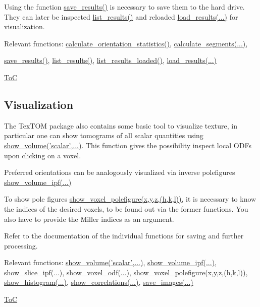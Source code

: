 Using the function \hyperref[fun:saveresults]{save\_results()} is necessary to save them to the hard drive.
They can later be inspected \hyperref[fun:listresults]{list\_results()} and reloaded \hyperref[fun:loadresults]{load\_results(...)}
for visualization.

Relevant functions:
\hyperref[fun:calculateorientationstatistics]{calculate\_orientation\_statistics()},
\hyperref[fun:calculatesegments]{calculate\_segments(...)},

\hyperref[fun:saveresults]{save\_results()},
\hyperref[fun:listresults]{list\_results()},
\hyperref[fun:listresultsloaded]{list\_results\_loaded()},
\hyperref[fun:loadresults]{load\_results(...)}

\begin{flushright}
    \hyperref[toc]{ToC}
\end{flushright}

\subsection{Visualization}
The TexTOM package also contains some basic tool to visualize texture, in particular
one can show tomograms of all scalar quantities using \hyperref[fun:showvolume]{show\_volume('scalar',...)}.
This function gives the possibility inspect local ODFs upon clicking on a voxel.

Preferred orientations can be analogously visualized via inverse polefigures \hyperref[fun:showvolume]{show\_volume\_ipf(...)}

To show pole figures \hyperref[fun:showvoxelpolefigure]{show\_voxel\_polefigure(x,y,z,(h,k,l))}, it is necessary to know 
the indices of the desired voxels, to be found out via the former functions. You also have to provide the
Miller indices as an argument.

Refer to the documentation of the individual functions for saving and further processing.

Relevant functions:
\hyperref[fun:showvolume]{show\_volume('scalar',...)},
\hyperref[fun:showvolumeipf]{show\_volume\_ipf(...)},
\hyperref[fun:showsliceipf]{show\_slice\_ipf(...)},
\hyperref[fun:showvoxelodf]{show\_voxel\_odf(...)},
\hyperref[fun:showvoxelpolefigure]{show\_voxel\_polefigure(x,y,z,(h,k,l))},
\hyperref[fun:showhistogram]{show\_histogram(...)},
\hyperref[fun:showcorrelations]{show\_correlations(...)},
\hyperref[fun:saveimages]{save\_images(...)}

\begin{flushright}
    \hyperref[toc]{ToC}
\end{flushright}